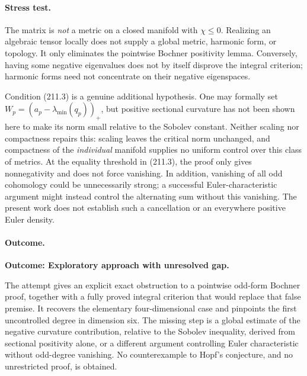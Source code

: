 \documentclass[11pt,a4paper]{article}
\begin{document}
\paragraph{Stress test.}
The matrix is \emph{not} a metric on a closed manifold with $\chi\le0$.
Realizing an algebraic tensor locally does not supply a global metric,
harmonic form, or topology. It only eliminates the pointwise Bochner
positivity lemma. Conversely, having some negative eigenvalues does not by
itself disprove the integral criterion; harmonic forms need not concentrate
on their negative eigenspaces.

Condition (211.3) is a genuine additional hypothesis. One may formally set
$W_p=(a_p-\lambda_{\min}(q_p))_+$, but positive sectional curvature has not
been shown here to make its norm small relative to the Sobolev constant.
Neither scaling nor compactness repairs this: scaling leaves the critical
norm unchanged, and compactness of the \emph{individual} manifold supplies
no uniform control over this class of metrics. At the equality threshold in
(211.3), the proof only gives nonnegativity and does not force vanishing.
In addition, vanishing of all odd cohomology could be unnecessarily strong;
a successful Euler-characteristic argument might instead control the
alternating sum without this vanishing. The present work does not establish
such a cancellation or an everywhere positive Euler density.

\paragraph{Outcome.}
\textbf{Outcome: Exploratory approach with unresolved gap.}

The attempt gives an explicit exact obstruction to a pointwise odd-form
Bochner proof, together with a fully proved integral criterion that would
replace that false premise. It recovers the elementary four-dimensional
case and pinpoints the first uncontrolled degree in dimension six. The
missing step is a global estimate of the negative curvature contribution,
relative to the Sobolev inequality, derived from sectional positivity alone,
or a different argument controlling Euler characteristic without odd-degree
vanishing. No counterexample to Hopf's conjecture, and no unrestricted proof,
is obtained.
\end{document}
